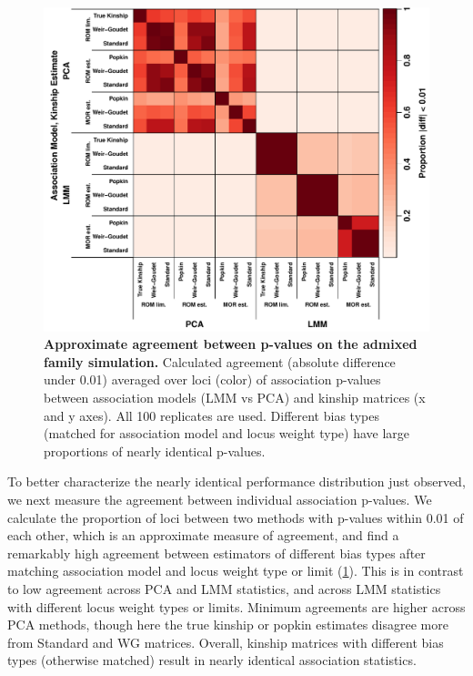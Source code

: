 \documentclass[11pt]{article}
\begin{document}
\begin{figure}[bp!]
  \centering
  \includegraphics[width=\textwidth]{sim-admix-n1000-m100000-k3-f0.3-s0.5-mc100-h0.8-g20-fes/pvals_eq.pdf}
  \caption{
    {\bf Approximate agreement between p-values on the admixed family simulation.}
    Calculated agreement (absolute difference under 0.01) averaged over loci (color) of association p-values between association models (LMM vs PCA) and kinship matrices (x and y axes).
    All 100 replicates are used.
    Different bias types (matched for association model and locus weight type) have large proportions of nearly identical p-values.
    }
  \label{fig:pvals_eq_sim}
\end{figure}

To better characterize the nearly identical performance distribution just observed, we next measure the agreement between individual association p-values.
We calculate the proportion of loci between two methods with p-values within 0.01 of each other, which is an approximate measure of agreement, and find a remarkably high agreement between estimators of different bias types after matching association model and locus weight type or limit (\cref{fig:pvals_eq_sim}).
This is in contrast to low agreement across PCA and LMM statistics, and across LMM statistics with different locus weight types or limits.
Minimum agreements are higher across PCA methods, though here the true kinship or popkin estimates disagree more from Standard and WG matrices.
Overall, kinship matrices with different bias types (otherwise matched) result in nearly identical association statistics.
\end{document}
